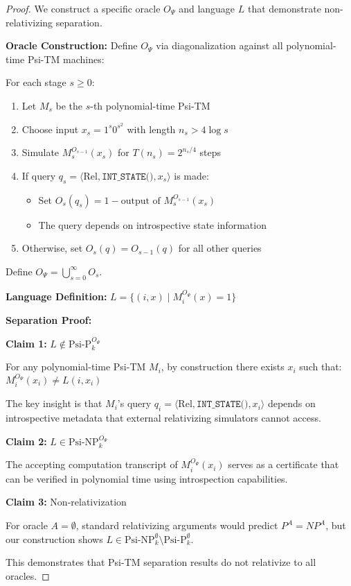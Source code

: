 \documentclass[11pt]{article}
\begin{document}
\begin{proof}
We construct a specific oracle $O_\Psi$ and language $L$ that demonstrate non-relativizing separation.

\textbf{Oracle Construction:}
Define $O_\Psi$ via diagonalization against all polynomial-time Psi-TM machines:

For each stage $s \geq 0$:
\begin{enumerate}
\item Let $M_s$ be the $s$-th polynomial-time Psi-TM
\item Choose input $x_s = 1^s 0^{s^2}$ with length $n_s > 4 \log s$
\item Simulate $M_s^{O_{s-1}}(x_s)$ for $T(n_s) = 2^{n_s/4}$ steps
\item If query $q_s = \langle \text{Rel}, \texttt{INT\_STATE()}, x_s \rangle$ is made:
   \begin{itemize}
   \item Set $O_s(q_s) = 1 - \text{output of } M_s^{O_{s-1}}(x_s)$
   \item The query depends on introspective state information
   \end{itemize}
\item Otherwise, set $O_s(q) = O_{s-1}(q)$ for all other queries
\end{enumerate}

Define $O_\Psi = \bigcup_{s=0}^{\infty} O_s$.

\textbf{Language Definition:}
$L = \{(i, x) \mid M_i^{O_\Psi}(x) = 1\}$

\textbf{Separation Proof:}

\textbf{Claim 1:} $L \notin \text{Psi-P}^{O_\Psi}_k$

For any polynomial-time Psi-TM $M_i$, by construction there exists $x_i$ such that:
$M_i^{O_\Psi}(x_i) \neq L(i, x_i)$

The key insight is that $M_i$'s query $q_i = \langle \text{Rel}, \texttt{INT\_STATE()}, x_i \rangle$ depends on introspective metadata that external relativizing simulators cannot access.

\textbf{Claim 2:} $L \in \text{Psi-NP}^{O_\Psi}_k$

The accepting computation transcript of $M_i^{O_\Psi}(x_i)$ serves as a certificate that can be verified in polynomial time using introspection capabilities.

\textbf{Claim 3:} Non-relativization

For oracle $A = \emptyset$, standard relativizing arguments would predict $P^A = NP^A$, but our construction shows $L \in \text{Psi-NP}^{\emptyset}_k \setminus \text{Psi-P}^{\emptyset}_k$.

This demonstrates that Psi-TM separation results do not relativize to all oracles.
\end{proof}
\end{document}

